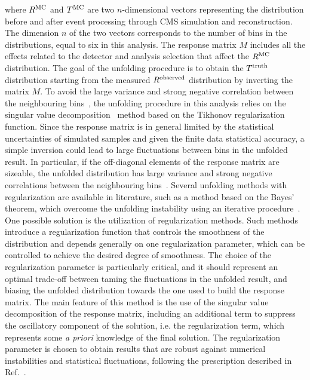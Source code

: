 where $R^{\rm{MC}}$ and $T^{\rm{MC}}$ are two $n$-dimensional vectors
representing the distribution before and after event processing through CMS
simulation and reconstruction. The dimension $n$ of the two vectors corresponds 
to the number of bins in the distributions, equal to six in this analysis.
The response matrix $M$ includes all the effects related to the detector and analysis selection that affect the $R^{\rm{MC}}$ distribution.
The goal of the unfolding procedure is to obtain the $T^{\rm{truth}}$ distribution starting from the measured
$R^{\rm{observed}}$ distribution by inverting the matrix $M$.
To avoid the large variance and strong negative correlation between the neighbouring bins~\cite{Cowan:2002in}, the unfolding procedure in this analysis relies on the singular value decomposition~\cite{Hocker:1995kb} method based on the Tikhonov regularization
function.
Since the response matrix is in general limited by the statistical uncertainties of simulated samples and given the finite data statistical accuracy, a simple inversion could lead to large fluctuations between bins in the unfolded result. In particular, if the off-diagonal elements
of the response matrix are sizeable, the unfolded distribution has large variance and 
strong negative correlations between the neighbouring bins~\cite{Cowan:2002in}.
Several unfolding methods with regularization are available in literature, such as a method based on the Bayes' theorem, which overcome 
the unfolding instability using an iterative procedure~\cite{DAgostini:1994zf}.
One possible solution is the utilization of regularization methods.
Such methods introduce a regularization function that controls the smoothness of the distribution 
and depends generally on one regularization parameter, which can be controlled
to achieve the desired degree of smoothness.
The choice of the regularization parameter is particularly critical, and it
should represent an optimal trade-off between taming the fluctuations in the
unfolded result, and biasing the unfolded distribution towards the one used to
build the response matrix. 
The main feature of this method is the use of the singular value decomposition of the response matrix, including an additional term to suppress the oscillatory component of the solution, i.e. the regularization term, which represents some \textit{a priori} knowledge of the final solution.
The regularization parameter is chosen to obtain results that are robust against numerical instabilities and statistical fluctuations, following the prescription described in Ref.~\cite{Hocker:1995kb}.

